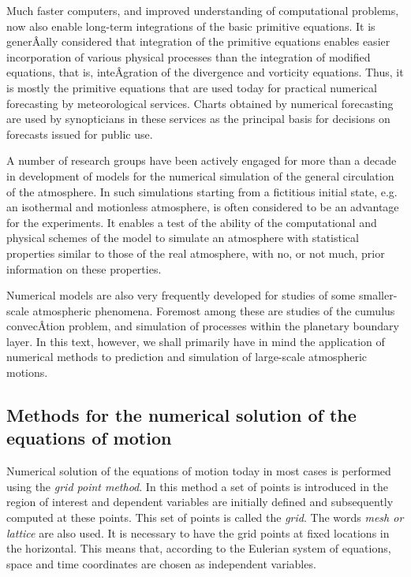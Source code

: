 Much faster computers, and improved understanding of computational
problems, now also enable long-term integrations of the basic primitive
equations. It is generÂ­ally considered that integration of the primitive
equations enables easier incorporation of various physical processes
than the integration of modified equations, that is, inteÂ­gration of the
divergence and vorticity equations. Thus, it is mostly the primitive
equations that are used today for practical numerical forecasting by
meteorological services. Charts obtained by numerical forecasting are
used by synopticians in these services as the principal basis for
decisions on forecasts issued for public use.

A number of research groups have been actively engaged for more than a
decade in development of models for the numerical simulation of the
general circulation of the atmosphere. In such simulations starting from
a fictitious initial state, e.g. an isothermal and motionless
atmosphere, is often considered to be an advantage for the experiments.
It enables a test of the ability of the computational and physical
schemes of the model to simulate an atmosphere with statistical
properties similar to those of the real atmosphere, with no, or not
much, prior information on these properties.

Numerical models are also very frequently developed for studies of some
smaller-scale atmospheric phenomena. Foremost among these are studies of
the cumulus convecÂ­tion problem, and simulation of processes within the
planetary boundary layer. In this text, however, we shall primarily have
in mind the application of numerical methods to prediction and
simulation of large-scale atmospheric motions.

\subsection{\texorpdfstring{\textbf{Methods for the numerical solution
of the equations of
motion}}{Methods for the numerical solution of the equations of motion}}\label{methods-for-the-numerical-solution-of-the-equations-of-motion}

Numerical solution of the equations of motion today in most cases is
performed using the \emph{grid point method}. In this method a set of
points is introduced in the region of interest and dependent variables
are initially defined and subsequently computed at these points. This
set of points is called the \emph{grid}. The words \emph{mesh or
lattice} are also used. It is necessary to have the grid points at fixed
locations in the horizontal. This means that, according to the Eulerian
system of equations, space and time coordinates are chosen as
independent variables.

